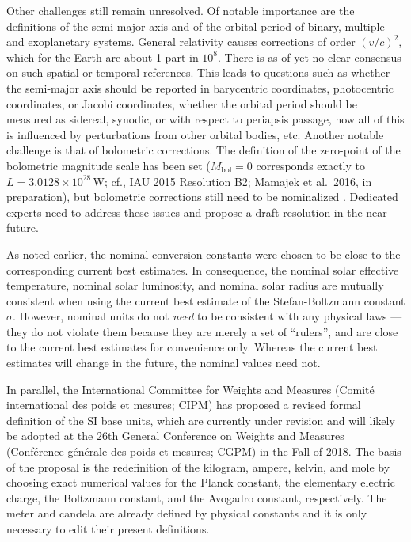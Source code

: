 \documentclass[preprint]{aastex}
\newcommand{\rev}[1]{{#1}}
\begin{document}
Other challenges still remain unresolved. Of notable importance are the definitions of the semi-major axis and of the orbital period of binary, multiple and exoplanetary systems. General relativity causes corrections of order $(v/c)^2$, which for the Earth are about 1 part in $10^8$. There is \rev{as of yet} no clear consensus on such spatial or temporal references. \rev{This leads to questions such as whether} the semi-major axis \rev{should} be \rev{reported} in barycentric coordinates, photocentric coordinates, or Jacobi coordinates, \rev{whether} the orbital period \rev{should} be measured as sidereal, synodic, or with respect to periapsis passage, how \rev{all of this is influenced by perturbations from} other orbital bodies, etc. Another notable challenge is that of bolometric corrections. The definition of the zero-point of the bolometric magnitude scale has been set ($M_\mathrm{bol} = 0$ corresponds exactly to $L = 3.0128 \times 10^{28}$\,W; cf., IAU 2015 Resolution B2; Mamajek et al.~2016, in preparation), but bolometric corrections still need to be nominalized \citep{torres2010b}. Dedicated experts need to address these issues and propose a draft resolution in the near future.

As noted earlier, the nominal conversion constants were chosen to be close to the corresponding current best estimates. In consequence, the nominal solar effective temperature, nominal solar luminosity, and nominal solar radius are mutually consistent when using the current best estimate of the Stefan-Boltzmann constant $\sigma$. However, nominal units do not \emph{need} to be consistent with any physical laws --- they do not violate them because they are merely a set of ``rulers'', and are close to the current best estimates for convenience only. Whereas the current best estimates will change in the future, the nominal values need not.

In parallel, the International Committee for Weights and Measures (Comit\' e international des poids et mesures; CIPM) has proposed a revised formal definition of the SI base units, which are currently under revision and will likely be adopted at the 26th General Conference on Weights and Measures (Conf\' erence g\' en\' erale des poids et mesures; CGPM) in the Fall of 2018. The basis of the proposal is the redefinition of the kilogram, ampere, kelvin, and mole by choosing exact numerical values for the Planck constant, the elementary electric charge, the Boltzmann constant, and the Avogadro constant, respectively. The meter and candela are already defined by physical constants and it is only necessary to edit their present definitions.
\end{document}

